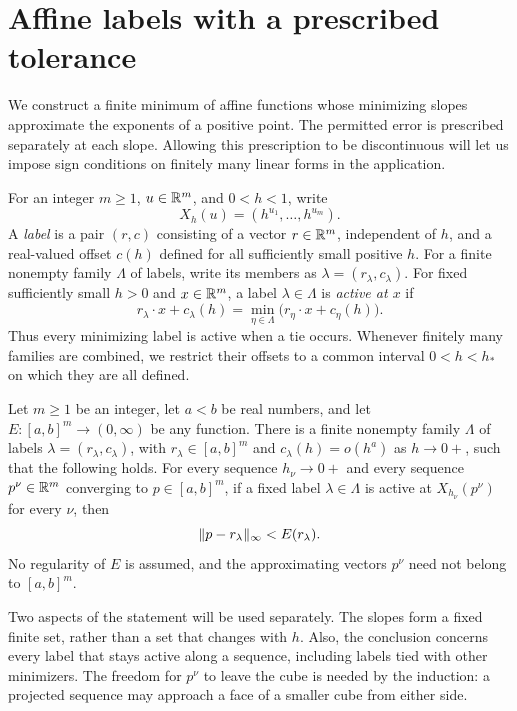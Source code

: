 \section{Affine labels with a prescribed tolerance}
\label{sec:affine}

We construct a finite minimum of affine functions whose minimizing slopes
approximate the exponents of a positive point.  The permitted error is
prescribed separately at each slope.  Allowing this prescription to be
discontinuous will let us impose sign conditions on finitely many linear
forms in the application.

For an integer $m\geq 1$, $u\in\mathbb R^m$, and $0<h<1$, write
\[
  X_h(u)=(h^{u_1},\ldots,h^{u_m}).
\]
A \emph{label} is a pair $(r,c)$ consisting of a vector $r\in\mathbb R^m$,
independent of $h$, and a real-valued offset $c(h)$ defined for all
sufficiently small positive $h$.  For a finite nonempty family $\Lambda$
of labels, write its members as $\lambda=(r_\lambda,c_\lambda)$.
For fixed sufficiently small $h>0$ and $x\in\mathbb R^m$, a label
$\lambda\in\Lambda$ is \emph{active at $x$} if
\[
  r_\lambda\cdot x+c_\lambda(h)
  =\min_{\eta\in\Lambda}\bigl(r_\eta\cdot x+c_\eta(h)\bigr).
\]
Thus every minimizing label is active when a tie occurs.  Whenever finitely
many families are combined, we restrict their offsets to a common interval
$0<h<h_*$ on which they are all defined.

\begin{lemma}
\label{lem:affine}
Let $m\geq 1$ be an integer, let $a<b$ be real numbers, and let
$E:[a,b]^m\to(0,\infty)$ be any function.  There is a finite nonempty
family $\Lambda$ of labels $\lambda=(r_\lambda,c_\lambda)$, with
$r_\lambda\in[a,b]^m$ and $c_\lambda(h)=o(h^a)$ as $h\to0+$, such
that the following holds.
For every sequence $h_\nu\to0+$ and every sequence $p^\nu\in\mathbb R^m$
converging to $p\in[a,b]^m$, if a fixed label $\lambda\in\Lambda$ is
active at $X_{h_\nu}(p^\nu)$ for every $\nu$, then
\[
  \lVert p-r_\lambda\rVert_\infty<E(r_\lambda).
\]
No regularity of $E$ is assumed, and the approximating vectors $p^\nu$
need not belong to $[a,b]^m$.
\end{lemma}

Two aspects of the statement will be used separately. The slopes form a
fixed finite set, rather than a set that changes with $h$. Also, the
conclusion concerns every label that stays active along a sequence,
including labels tied with other minimizers. The freedom for $p^\nu$ to
leave the cube is needed by the induction: a projected sequence may
approach a face of a smaller cube from either side.

